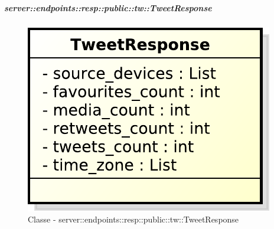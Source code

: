     \subparagraph{server::endpoints::resp::public::tw::TweetResponse} %
    \label{subp:bdsm_app_server_endpoints_resp_public_tw_tweetresponse}
  \begin{figure}[!htbp]
    \centering
    \centerline{\includegraphics[scale=0.6]{./images/server/classes/endpoints/tw/tweet_response.pdf}}
    \caption{Classe - server::endpoints::resp::public::tw::TweetResponse}
  \end{figure}
